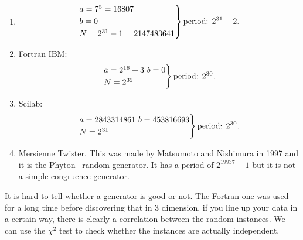 \documentclass[12pt]{report}
\begin{document}
\begin{enumerate}[\circnum]
	\item 
	\begin{equation*}
		\begin{rcases}
			a=7^{5}=16807\\
			b=0\\
			N=2^{31}-1=2147483641
		\end{rcases}\text{period: }2^{31}-2.
	\end{equation*}
	\item Fortran IBM:
	\begin{equation*}
		\begin{rcases}
			a=2^{16}+3\
			b=0\\
			N=2^{32}
		\end{rcases}\text{period: }2^{30}.
	\end{equation*}
	\item Scilab:
	\begin{equation*}
		\begin{rcases}
			a=2843314861\
			b=453816693\\
			N=2^{31}
		\end{rcases}\text{period: }2^{30}.
	\end{equation*}
	\item Mersienne Twister. This was made by Matsumoto and Nishimura in 1997 and it is the Phyton \faPython\, random generator. It has a period of $2^{19937}-1$ but it is not a simple congruence generator.
\end{enumerate}
It is hard to tell whether a generator is good or not. The Fortran one was used for a long time before discovering that in 3 dimension, if you line up your data in a certain way, there is clearly a correlation between the random instances. We can use the $\chi^{2}$ test to check whether the instances are actually independent.
\end{document}

